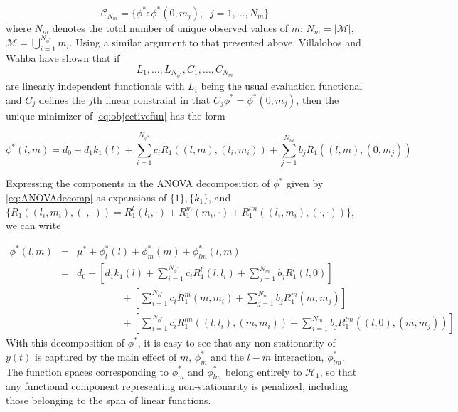 \[
 \mathcal{C}_{N_m} = \lbrace \phi^*: \phi^*\left(0,m_j \right),\;\;j = 1, \dots, N_m  \rbrace
 \]
\noindent where $N_m$ denotes the total number of unique observed values of $m$: $N_m = \vert \mathcal{M} \vert$, $\mathcal{M} = \bigcup_{i=1}^{N_{\phi^*}} m_i$. Using a similar argument to that presented above, Villalobos and Wahba have shown that if 
\[
L_1, \dots, L_{N_{\phi^*}}, C_1, \dots, C_{N_m}\]
\noindent are linearly independent functionals with $L_i$ being the usual evaluation functional and $C_j$ defines the $j$th linear constraint in that $C_j \phi^* = \phi^*\left(0,m_j\right)$, then the unique minimizer of \eqref{eq:objectivefun} has the form

\begin{equation}
\phi^*\left(l,m\right) =  d_0 + d_1k_1\left(l\right) + \sum_{i=1}^{N_{\phi^*}} c_i R_1\left( \left(l,m\right) , \left(l_i,m_i \right)\right) + \sum_{j=1}^{N_{m}} b_j R_1\left( \left(l,m\right) , \left(0,m_j \right)\right)
\end{equation}

\noindent
Expressing the components in the ANOVA decomposition of $\phi^*$ given by \eqref{eq:ANOVAdecomp} as expansions of $\lbrace 1 \rbrace, \lbrace k_1 \rbrace$, and $\lbrace R_1\left(\left(l_i,m_i \right), \left(\cdot,\cdot\right)\right) = R^l_1\left(l_i,\cdot \right) + R^m_1\left(m_i,\cdot \right) + R^{lm}_1\left(\left(l_i,m_i \right), \left(\cdot,\cdot\right)\right) \rbrace$, we can write

\begin{eqnarray*}
\phi^*\left(l,m\right) &=& \mu^* +  \phi_l^*\left(l\right) + \phi_m^*\left(m\right) + \phi_{lm}^*\left(l,m\right)\\
&=& d_0 + \left[ d_1k_1\left(l\right) + \sum_{i=1}^{N_{\phi^*}}  c_i R^l_1\left( l,l_i\right) + \sum_{j=1}^{N_{m}}  b_j R^l_1\left( l,0\right) \right]\\
&\mbox{ }& \;\;\;\;\;\;\;\;\;\;\;\;\;\;\;\; +\left[ \sum_{i=1}^{N_{\phi^*}}  c_i R^m_1\left( m,m_i\right) + \sum_{j=1}^{N_{m}}  b_j R^m_1\left( m,m_j\right)\right] \\
&\mbox{ }& \;\;\;\;\;\;\;\;\;\;\;\;\;\;\;\;+\left[  \sum_{i=1}^{N_{\phi^*}} c_i R^{lm}_1\left(\left( l,l_i\right), \left( m,m_i\right)\right) +  \sum_{i=1}^{N_m} b_j R^{lm}_1\left(\left( l,0\right), \left( m,m_j\right)\right) \right]
\end{eqnarray*}
\noindent
With this decomposition of $\phi^*$, it is easy to see that any non-stationarity of $y\left(t\right)$ is captured by the main effect of $m$, $\phi^*_m$ and the $l-m$ interaction, $\phi^*_{lm}$. The function spaces corresponding to $\phi^*_m$ and $\phi^*_{lm}$ belong entirely to $\mathcal{H}_1$, so that any functional component representing non-stationarity is penalized, including those belonging to the span of linear functions. 

